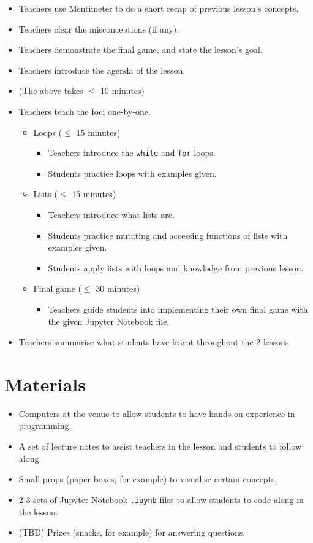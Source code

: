 \documentclass{article}
\def\T{Teachers }
\def\t{teachers }
\def\S{Students }
\def\s{students }
\begin{document}
\begin{itemize}
\item \T use Mentimeter to do a short recap of previous lesson's concepts.
\item \T clear the misconceptions (if any).
\item \T demonstrate the final game, and state the lesson's goal.
\item \T introduce the agenda of the lesson.
\item[] (The above takes $\leq$ 10 minutes)
\item \T teach the foci one-by-one.
	\begin{itemize}
	\item Loops ($\leq$ 15 minutes)
		\begin{itemize}
		\item \T introduce the \texttt{while} and \texttt{for} loops.
		\item \S practice loops with examples given.
		\end{itemize}
	\item Lists ($\leq$ 15 minutes)
		\begin{itemize}
		\item \T introduce what lists are.
		\item \S practice mutating and accessing functions of lists with examples given.
		\item \S apply lists with loops and knowledge from previous lesson.
		\end{itemize}
	\item Final game ($\leq$ 30 minutes)
		\begin{itemize}
		\item \T guide \s into implementing their own final game with the given Jupyter Notebook file. 
		\end{itemize}
	\end{itemize}
\item \T summarise what \s have learnt throughout the 2 lessons.
\end{itemize}

\section*{Materials}

\begin{itemize}
\item Computers at the venue to allow \s to have hands-on experience in programming.
\item A set of lecture notes to assist \t in the lesson and \s to follow along.
\item Small props (paper boxes, for example) to visualise certain concepts.
\item 2-3 sets of Jupyter Notebook \texttt{.ipynb} files to allow \s to code along in the lesson.
\item (TBD) Prizes (snacks, for example) for answering questions.
\end{itemize}
\end{document}
